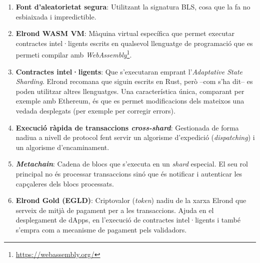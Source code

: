 \documentclass[11pt,a4paper]{article}
\begin{document}
\begin{enumerate}
  \item \textbf{Font d'aleatorietat segura}: Utilitzant la signatura BLS, cosa que la fa no esbiaixada i impredictible.
  \item \textbf{Elrond WASM VM}: Màquina virtual específica que permet executar contractes intel·ligents escrits en qualsevol llenguatge de programació que es permeti compilar amb  \textit{WebAssembly}\footnote{\url{https://webassembly.org/}}.
  \item \textbf{Contractes intel·ligents}: Que s'executaran emprant l'\textit{Adaptative State Sharding}. Elrond recomana que siguin escrits en Rust, però –com s'ha dit– es poden utilitzar altres llenguatges. Una característica única, comparant per exemple amb Ethereum, és que es permet modificacions dels mateixos una vedada desplegats \cite{cwirko01} (per exemple per corregir errors).
  \item \textbf{Execució ràpida de transaccions \textit{cross-shard}}: Gestionada de forma nadiua a nivell de protocol fent servir un algorisme d'expedició (\textit{dispatching}) i un algorisme d'encaminament.
   \item \textbf{\textit{Metachain}}: Cadena de blocs que s'executa en un \textit{shard} especial. El seu rol principal no és processar transaccions sinó que  és notificar i autenticar les capçaleres dels blocs processats.
   \item \textbf{Elrond Gold (EGLD)}: Criptovalor (\textit{token}) nadiu de la xarxa Elrond que serveix de mitjà de pagament per a les transaccions. Ajuda en el desplegament de dApps, en l'execució de contractes intel·ligents i també s'empra com a mecanisme de pagament pels validadors. 
\end{enumerate}
\end{document}
